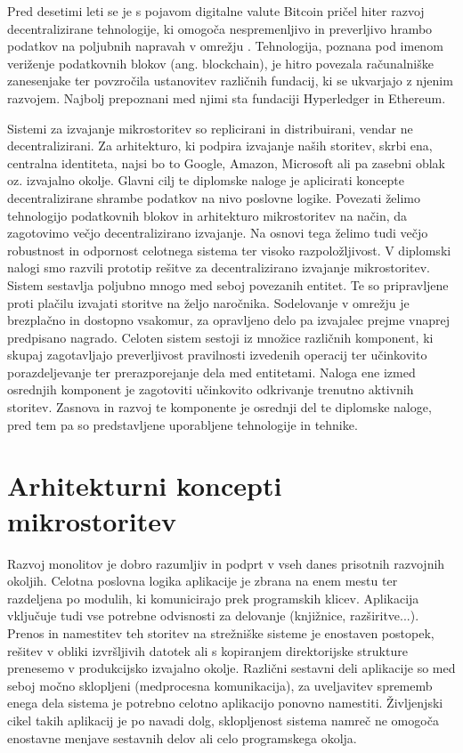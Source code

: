 \documentclass[a4paper, 12pt]{book}
\begin{document}
Pred desetimi leti se je s pojavom digitalne valute Bitcoin pričel hiter razvoj decentralizirane tehnologije, ki omogoča nespremenljivo in preverljivo hrambo podatkov na poljubnih napravah v omrežju \cite{nakamoto2008bitcoin}.
Tehnologija, poznana pod imenom veriženje podatkovnih blokov (ang. blockchain), je hitro povezala računalniške zanesenjake ter povzročila ustanovitev različnih fundacij, ki se ukvarjajo z njenim razvojem.
Najbolj prepoznani med njimi sta fundaciji Hyperledger in Ethereum.

Sistemi za izvajanje mikrostoritev so replicirani in distribuirani, vendar ne decentralizirani.
Za arhitekturo, ki podpira izvajanje naših storitev, skrbi ena, centralna identiteta, najsi bo to Google, Amazon, Microsoft ali pa zasebni oblak oz. izvajalno okolje.
Glavni cilj te diplomske naloge je aplicirati koncepte decentralizirane shrambe podatkov na nivo poslovne logike.
Povezati želimo tehnologijo podatkovnih blokov in arhitekturo mikrostoritev na način, da zagotovimo večjo decentralizirano izvajanje. 
Na osnovi tega želimo tudi večjo robustnost in odpornost celotnega sistema ter visoko razpoložljivost.
V diplomski nalogi smo razvili prototip rešitve za decentralizirano izvajanje mikrostoritev.
Sistem sestavlja poljubno mnogo med seboj povezanih entitet.
Te so pripravljene proti plačilu izvajati storitve na željo naročnika.
Sodelovanje v omrežju je brezplačno in dostopno vsakomur, za opravljeno delo pa izvajalec prejme vnaprej predpisano nagrado.
Celoten sistem sestoji iz množice različnih komponent, ki skupaj zagotavljajo preverljivost pravilnosti izvedenih operacij ter učinkovito porazdeljevanje ter prerazporejanje dela med entitetami.
Naloga ene izmed osrednjih komponent je zagotoviti učinkovito odkrivanje trenutno aktivnih storitev.
Zasnova in razvoj te komponente je osrednji del te diplomske naloge, pred tem pa so predstavljene uporabljene tehnologije in tehnike.

\chapter{Arhitekturni koncepti mikrostoritev}
\label{ch1}

Razvoj monolitov je dobro razumljiv in podprt v vseh danes prisotnih razvojnih okoljih.
Celotna poslovna logika aplikacije je zbrana na enem mestu ter razdeljena po modulih, ki komunicirajo prek programskih klicev.
Aplikacija vključuje tudi vse potrebne odvisnosti za delovanje (knjižnice, razširitve...).
Prenos in namestitev teh storitev na strežniške sisteme je enostaven postopek, rešitev v obliki izvršljivih datotek ali s kopiranjem direktorijske strukture prenesemo v produkcijsko izvajalno okolje.
Različni sestavni deli aplikacije so med seboj močno sklopljeni (medprocesna komunikacija), za uveljavitev sprememb enega dela sistema je potrebno celotno aplikacijo ponovno namestiti.
Življenjski cikel takih aplikacij je po navadi dolg, sklopljenost sistema namreč ne omogoča enostavne menjave sestavnih delov ali celo programskega okolja.
\end{document}
